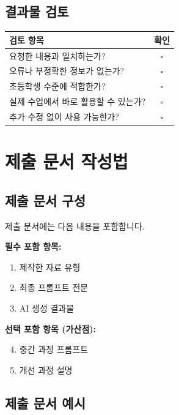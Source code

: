 \documentclass[11pt,a4paper]{article}
\begin{document}
\subsection{결과물 검토}

\begin{center}
\begin{tabular}{|l|c|}
\hline
\rowcolor{lightblue}
\textbf{검토 항목} & \textbf{확인} \\
\hline
요청한 내용과 일치하는가? & $\square$ \\
\hline
오류나 부정확한 정보가 없는가? & $\square$ \\
\hline
초등학생 수준에 적합한가? & $\square$ \\
\hline
실제 수업에서 바로 활용할 수 있는가? & $\square$ \\
\hline
추가 수정 없이 사용 가능한가? & $\square$ \\
\hline
\end{tabular}
\end{center}

\newpage

\section{제출 문서 작성법}

\subsection{제출 문서 구성}

제출 문서에는 다음 내용을 포함합니다.

\textbf{필수 포함 항목:}
\begin{enumerate}
  \item 제작한 자료 유형
  \item 최종 프롬프트 전문
  \item AI 생성 결과물
\end{enumerate}

\textbf{선택 포함 항목 (가산점):}
\begin{enumerate}
  \setcounter{enumi}{3}
  \item 중간 과정 프롬프트
  \item 개선 과정 설명
\end{enumerate}

\subsection{제출 문서 예시}
\end{document}
